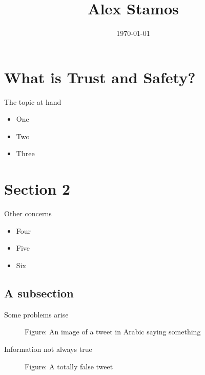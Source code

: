 \documentclass[nobackground,dvipsnames,table]{beamer}
\title[An Introduction to Trust and Safety}
\subtitle{CS 152 - Lecture 1}
\author[A. Stamos]{Alex Stamos}
\institute[SIO]{\large Stanford Internet Observatory}
\date[2022]{\today}
\begin{document}
\coverpage

\begin{frame}
    \titlepage
\end{frame}

\section{What is Trust and Safety?}

\begin{frame}{The topic at hand}
    \begin{itemize}
        \item One
        \item Two
        \item Three
    \end{itemize}
\end{frame}

\section{Section 2}

\begin{frame}{Other concerns}
    \begin{itemize}
        \item Four
        \item Five
        \item Six
    \end{itemize}
\end{frame}

\subsection{A subsection}

\begin{frame}{Some problems arise}
    \begin{figure}[ht]
        \center
        {Figure: An image of a tweet in Arabic saying something}
    \end{figure}
\end{frame}

\begin{frame}{Information not always true }
    \begin{figure}[ht]
        \center
        {Figure: A totally false tweet}
    \end{figure}
\end{frame}


\backpage
\end{document}
